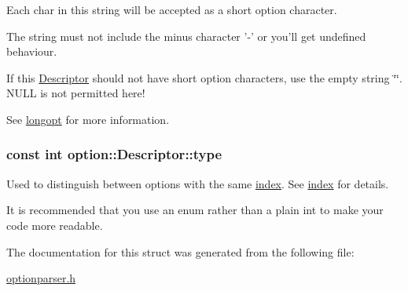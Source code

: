 \-Each char in this string will be accepted as a short option character. 

\-The string must not include the minus character {\ttfamily '-\/'} or you'll get undefined behaviour.

\-If this \hyperlink{structoption_1_1_descriptor}{\-Descriptor} should not have short option characters, use the empty string \char`\"{}\char`\"{}. \-N\-U\-L\-L is not permitted here!

\-See \hyperlink{structoption_1_1_descriptor_a470c449dfa894c9bfda2dae026142b4b}{longopt} for more information. \hypertarget{structoption_1_1_descriptor_a1b220dabd8aad075fa441a80f9b9343c}{
\subsubsection[{type}]{\setlength{\rightskip}{0pt plus 5cm}const int {\bf option\-::\-Descriptor\-::type}}}\label{structoption_1_1_descriptor_a1b220dabd8aad075fa441a80f9b9343c}


\-Used to distinguish between options with the same \hyperlink{structoption_1_1_descriptor_a1fee8ac44f529c99ac2b1149b4c391b1}{index}. \-See \hyperlink{structoption_1_1_descriptor_a1fee8ac44f529c99ac2b1149b4c391b1}{index} for details. 

\-It is recommended that you use an enum rather than a plain int to make your code more readable. 

\-The documentation for this struct was generated from the following file\-:\begin{DoxyCompactItemize}
\item 
\hyperlink{optionparser_8h}{optionparser.\-h}\end{DoxyCompactItemize}
